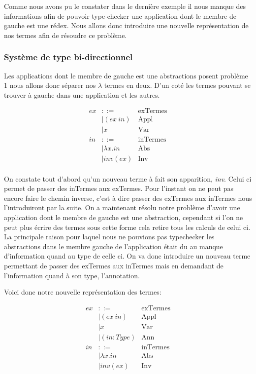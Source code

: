 \documentclass {article}
\theoremstyle{definition}
\theoremstyle{remark}
\begin{document}
Comme nous avons pu le constater dans le dernière exemple il nous manque des informations
afin de pouvoir type-checker une application dont le membre de gauche est une rédex.
Nous allons donc introduire une nouvelle représentation de nos termes afin de résoudre ce 
problème.

\subsubsection{Système de type bi-directionnel}

Les applications dont le membre de gauche est une abstractions posent problème 1
nous allons donc séparer nos \(\lambda\) termes en deux.
D'un coté les termes pouvant se trouver à gauche dans une application et les autres.

\begin{align*}
  ex &::= & \mbox{exTermes} \\
  &| (ex\: in) &\mbox{Appl}\\
  &| x &\mbox{Var} \\
  in &::= & \mbox{inTermes}\\
  &|\lambda x.in &\mbox{Abs}\\
  &|inv(ex) &\mbox{Inv}\\
\end{align*}

On constate tout d'abord qu'un nouveau terme à fait son apparition, \emph{inv}.
Celui ci permet de passer des inTermes aux exTermes. Pour l'instant on ne peut pas
encore faire le chemin inverse, c'est à dire passer des exTermes aux inTermes nous 
l'introduiront par la suite.
On a maintenant résolu notre problème d'avoir une application dont le membre de gauche
est une abstraction, cependant si l'on ne peut plus écrire des termes sous cette forme
cela retire tous les calculs de celui ci.
La principale raison pour laquel nous ne pouvions pas typechecker les abstractions 
dans le membre gauche de l'application était du au manque d'information quand au type 
de celle ci.
On va donc introduire un nouveau terme permettant de passer des exTermes aux inTermes 
mais en demandant de l'information quand à son type, l'annotation.

Voici donc notre nouvelle représentation des termes:

\begin{align*}
  ex &::= & \mbox{exTermes} \\
  &| (ex\: in) &\mbox{Appl} \\
  &| x &\mbox{Var} \\
  &| (in:Type)&\mbox{Ann} \\
  in &::= & \mbox{inTermes} \\
  &|\lambda x.in &\mbox{Abs} \\ 
  &|inv(ex) &\mbox{Inv} \\
\end{align*}
\end{document}
